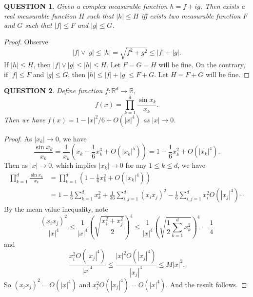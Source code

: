 \documentclass[12pt]{article}
\renewcommand{\(}{\left(}%
\renewcommand{\)}{\right)}%
\renewcommand{\[}{\left[}%
\renewcommand{\]}{\right]}%
\renewcommand{\r}{\mathbb{R}}
\newtheorem{question}{QUESTION}[section]}
\newtheorem{proof}{Proof.}}
\begin{document}
  \begin{question}
  	Given a complex measurable function $h=f+ig$. Then exists a real measurable function $H$ such that $|h|\leq H$ iff exists two measurable function $F$ and $G$ such that $|f|\leq F$ and $|g|\leq G$. 
  \end{question}
  \begin{proof}
  	Observe 
  	\begin{equation*}
  		|f|\vee |g|\leq  |h|=\sqrt{f^2+g^2}\leq |f|+|g|.
  	\end{equation*}
  	If $|h|\leq H$, then $|f|\vee |g|\leq  |h|\leq H$. Let $F=G=H$ will be fine. On the contrary, if $|f|\leq F$ and $|g|\leq G$, then $|h|\leq |f|+|g|\leq F+G$. Let $H=F+G$ will be fine.
  \end{proof}
  
  \begin{question}
  	Define function $f:\r^d\to \r$,
  	\begin{equation*}
  		f(x)=\prod_{k=1}^d \frac{\sin x_k}{x_k}.
  	\end{equation*}
  	Then we have $f(x)=1-|x|^2/6+O(|x|^4)$ as $|x|\to0$.
  \end{question}
  \begin{proof}
  	As $|x_k|\to 0$, we have
  	\begin{equation*}
  		\frac{\sin x_k}{x_k}=\frac{1}{x_k}\(x_k-\frac{1}{6}x_k^3+O(|x_k|^5) \)=1-\frac{1}{6}x_k^2+O(|x_k|^4).
  	\end{equation*}
  	Then as $|x|\to 0$, which implies $|x_k|\to 0$ for any $1\leq k\leq d$, we have
  	\begin{equation*}
  		\begin{split}
  			\prod_{k=1}^d \frac{\sin x_k}{x_k}&=\prod_{k=1}^d\(1-\frac{1}{6}x_k^2+O(|x_k|^4)\)\\
  			&=1-\frac{1}{6} \sum_{k=1}^d x_k^2+\frac{1}{36}\sum_{i,j=1}^d(x_ix_j)^2-\frac{1}{6}\sum_{i,j=1}^dx_i^2O(|x_j|^4) \cdots
  		\end{split}
  	\end{equation*}
  	By the mean value inequality, note
  	\begin{equation*}
  		\frac{(x_ix_j)^2}{|x|^4}\leq \frac{1}{|x|^4}\(\sqrt{\frac{x_i^2+x_j^2}{2} }\)^4\leq \frac{1}{|x|^4}\(\sqrt{\frac{1}{2}\sum_{k=1}^dx_k^2 }\)^4=\frac{1}{4}
  	\end{equation*}
  	and
  	\begin{equation*}
  		\frac{x_i^2O(|x_j|^4)}{|x|^4}\leq \frac{|x|^2O(|x_j|^4)}{|x_j|^4}\leq M|x|^2.
  	\end{equation*}
  	So $(x_ix_j)^2=O(|x|^4)$ and $x_i^2O(|x_j|^4)=O(|x|^4)$. And the result follows.
  \end{proof}
  
\end{document}

